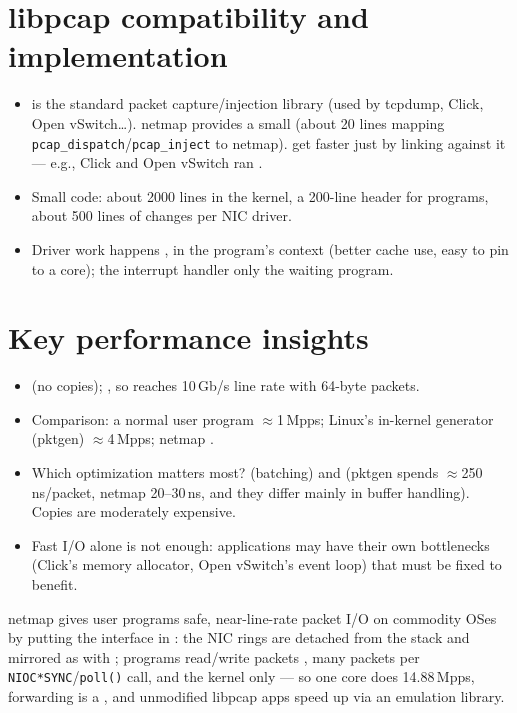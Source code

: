 \section{libpcap compatibility and implementation}
\begin{itemize}
\item {} is the standard packet capture/injection library (used by tcpdump, Click, Open vSwitch\ldots). netmap provides a small  (about 20 lines mapping \texttt{pcap\_dispatch}/\texttt{pcap\_inject} to netmap).  get faster just by linking against it --- e.g., Click and Open vSwitch ran .
\item Small code: about 2000 lines in the kernel, a 200-line header for programs, about 500 lines of changes per NIC driver.
\item Driver work happens , in the program's context (better cache use, easy to pin to a core); the interrupt handler only  the waiting program.
\end{itemize}

\section{Key performance insights}
\begin{itemize}
\item {} (no copies); , so  reaches 10\,Gb/s line rate with 64-byte packets.
\item Comparison: a normal user program $\approx$1\,Mpps; Linux's in-kernel generator (pktgen) $\approx$4\,Mpps; netmap .
\item Which optimization matters most?  (batching) and  (pktgen spends $\approx$250\,ns/packet, netmap 20--30\,ns, and they differ mainly in buffer handling). Copies are moderately expensive.
\item Fast I/O alone is not enough: applications may have their own bottlenecks (Click's memory allocator, Open vSwitch's event loop) that must be fixed to benefit.
\end{itemize}

\begin{keybox}
netmap gives user programs safe, near-line-rate packet I/O on commodity OSes by putting the interface in : the NIC rings are detached from the stack and mirrored as  with ; programs read/write packets ,  many packets per \texttt{NIOC*SYNC}/\texttt{poll()} call, and the kernel only  --- so one core does 14.88\,Mpps, forwarding is a , and unmodified libpcap apps speed up via an emulation library.
\end{keybox}

